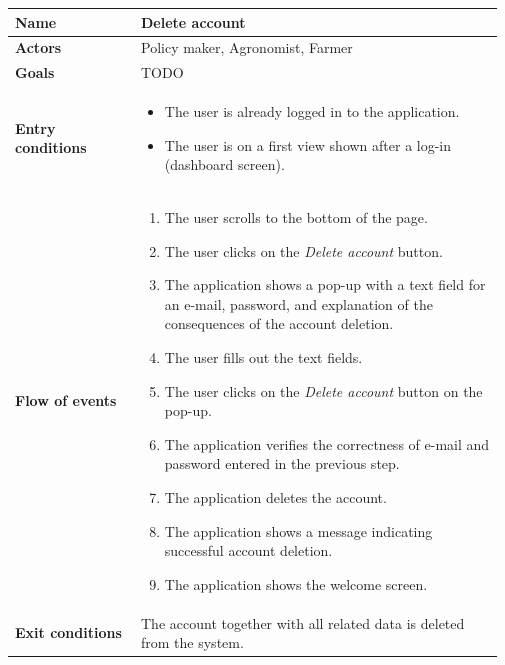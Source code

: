 \begin{table}[H]
    \centering
	\begin{tabular}{@{}p{0.25\linewidth} p{0.72\linewidth}@{}}
\toprule
		\textbf{Name}               & Delete account\\
		\midrule
		\textbf{Actors}             & Policy maker, Agronomist, Farmer\\
		\midrule
		\textbf{Goals}              & TODO \\
		\midrule
		
		\textbf{Entry conditions}   & \begin{itemize}[leftmargin=.4cm,noitemsep,topsep=0pt,before=\vspace{-3mm},after=\vspace{-4mm}]
		    \item The user is already logged in to the application.
		    \item The user is on a first view shown after a log-in (dashboard screen).
		\end{itemize}\\
		\midrule
		
		\textbf{Flow of events}     & \begin{enumerate}[leftmargin=.4cm,noitemsep,topsep=0pt,before=\vspace{-3mm},after=\vspace{-4mm}]
		    \item The user scrolls to the bottom of the page.
		    \item The user clicks on the \textit{Delete account} button.
		    \item The application shows a pop-up with a text field for an e-mail, password, and explanation of the consequences of the account deletion.
		    \item The user fills out the text fields.
		    \item The user clicks on the \textit{Delete account} button on the pop-up.
		    \item The application verifies the correctness of e-mail and password entered in the previous step.
		    \item The application deletes the account.
		    \item The application shows a message indicating successful account deletion.
		    \item The application shows the welcome screen.
		\end{enumerate}\\
		\midrule
		\textbf{Exit conditions}    & The account together with all related data is deleted from the system. \\
		\midrule
		

\end{tabular}
\end{table}
